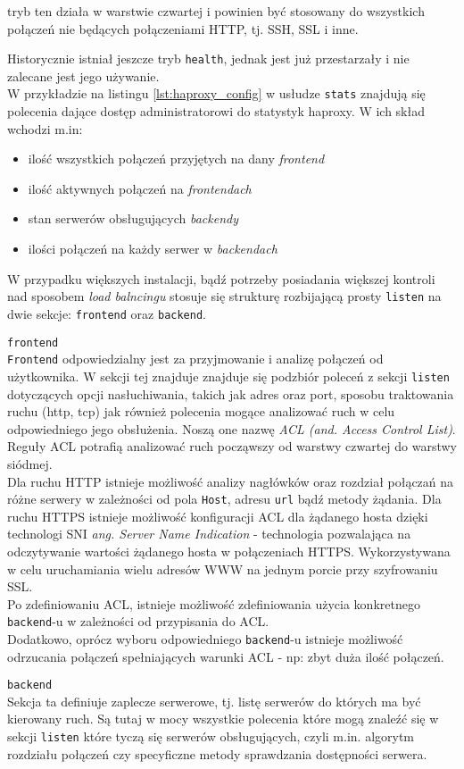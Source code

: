 {\begin{description}
\begin{itemize}
				tryb ten działa w warstwie czwartej i powinien być stosowany do wszystkich połączeń nie będących połączeniami HTTP, tj. SSH, SSL i inne.
		\end{itemize}
		Historycznie istniał jeszcze tryb \texttt{health}, jednak jest już przestarzały i nie zalecane jest jego używanie.\\
		W przykładzie na listingu \ref{lst:haproxy_config} w usłudze \texttt{stats} znajdują się polecenia dające dostęp administratorowi do statystyk haproxy.
		W ich skład wchodzi m.in:
		\begin{itemize}
			\item ilość wszystkich połączeń przyjętych na dany \textit{frontend}
			\item ilość aktywnych połączeń na \textit{frontendach}
			\item stan serwerów obsługujących \textit{backendy}
			\item ilości połączeń na każdy serwer w \textit{backendach}
		\end{itemize}
		W przypadku większych instalacji, bądź potrzeby posiadania większej kontroli nad sposobem \textit{load balncingu} stosuje się strukturę rozbijającą prosty \texttt{listen} na dwie sekcje: \texttt{frontend} oraz \texttt{backend}.
	\item{\texttt{frontend}}\\
		\texttt{Frontend} odpowiedzialny jest za przyjmowanie i analizę połączeń od użytkownika.
		W sekcji tej znajduje znajduje się podzbiór poleceń z sekcji \texttt{listen} dotyczących opcji nasłuchiwania, takich jak adres oraz port, sposobu traktowania ruchu (http, tcp) jak również polecenia mogące analizować ruch w celu odpowiedniego jego obsłużenia.
		Noszą one nazwę \textit{ACL (and. Access Control List)}.
		Reguły ACL potrafią analizować ruch począwszy od warstwy czwartej do warstwy siódmej.\\
		Dla ruchu HTTP istnieje możliwość analizy nagłówków oraz rozdział połączań na różne serwery w zależności od pola \texttt{Host}, adresu \texttt{url} bądź metody żądania.
		Dla ruchu HTTPS istnieje możliwość konfiguracji ACL dla żądanego hosta dzięki technologi SNI \textit{ang. Server Name Indication} - technologia pozwalająca na odczytywanie wartości żądanego hosta w połączeniach HTTPS.
		Wykorzystywana w celu uruchamiania wielu adresów WWW na jednym porcie przy szyfrowaniu SSL.\\
		Po zdefiniowaniu ACL, istnieje możliwość zdefiniowania użycia konkretnego \texttt{backend}-u w zależności od przypisania do ACL.\\
		Dodatkowo, oprócz wyboru odpowiedniego \texttt{backend}-u istnieje możliwość odrzucania połączeń spełniających warunki ACL - np: zbyt duża ilość połączeń.
	\item{\texttt{backend}}\\
		Sekcja ta definiuje zaplecze serwerowe, tj. listę serwerów do których ma być kierowany ruch.
		Są tutaj w mocy wszystkie polecenia które mogą znaleźć się w sekcji \texttt{listen} które tyczą się serwerów obsługujących, czyli m.in. algorytm rozdziału połączeń czy specyficzne metody sprawdzania dostępności serwera.
\end{description}
}
